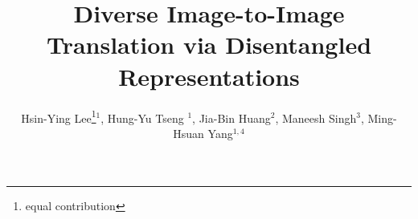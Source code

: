 \documentclass[runningheads]{llncs}
\makeatletter
\newcommand{\printfnsymbol}[1]{%
  \textsuperscript{\@fnsymbol{#1}}%
}
\makeatother
\begin{document}

\pagestyle{headings}
\mainmatter
\def\ECCV18SubNumber{153}  %

\title{Diverse Image-to-Image Translation via Disentangled Representations} 


\author{Hsin-Ying Lee\thanks{equal contribution}$^1$, Hung-Yu Tseng\printfnsymbol{1}$^1$, Jia-Bin Huang$^2$, Maneesh Singh$^3$, Ming-Hsuan Yang$^{1,4}$}

\maketitle
\end{document}

